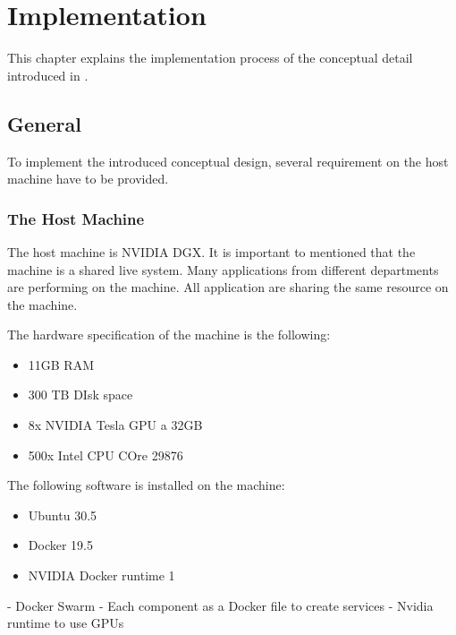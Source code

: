 \chapter{Implementation}
\label{chap:06_implementation}

This chapter explains the implementation process of the conceptual detail introduced in .


\section{General}
To implement the introduced conceptual design, several requirement on the host machine have to be provided.


\subsection{The Host Machine}
The host machine is NVIDIA DGX.
It is important to mentioned that the machine is a shared live system. Many applications from different departments are performing on the machine. All application are sharing the same resource on the machine.


The hardware specification of the machine is the following:
\begin{itemize}
\item 11GB RAM
\item 300 TB DIsk space 
\item 8x NVIDIA Tesla GPU a 32GB
\item 500x Intel CPU COre 29876
\end{itemize}


The following software is installed on the machine:
\begin{itemize}
\item Ubuntu 30.5
\item Docker 19.5
\item NVIDIA Docker runtime 1
\end{itemize}


- Docker Swarm 
- Each component as a Docker file to create services
- Nvidia runtime to use GPUs


